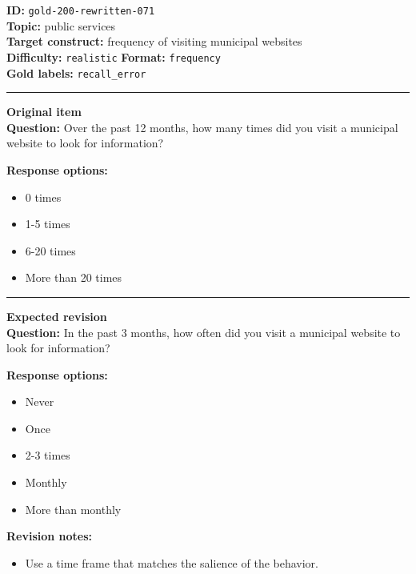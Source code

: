\documentclass[10pt,a4paper]{article}
\newcommand{\sectionline}{\vspace{0.15em}\hrule\vspace{0.35em}}
\begin{document}
\begin{tcolorbox}[colframe=FlawRed,colback=white,colbacktitle=FlawRed!9,coltitle=black,title={Item 071\hfill Flawed item}]
\textbf{ID:} \texttt{gold-200-rewritten-071}\\
\textbf{Topic:} public services\\
\textbf{Target construct:} frequency of visiting municipal websites\\
\textbf{Difficulty:} \texttt{realistic} \quad \textbf{Format:} \texttt{frequency}\\
\textbf{Gold labels:} \texttt{recall\_error}\\
\sectionline
\textbf{Original item}\\
\textbf{Question:} Over the past 12 months, how many times did you visit a municipal website to look for information?
\par\textbf{Response options:}
\begin{itemize}
\item 0 times
\item 1-5 times
\item 6-20 times
\item More than 20 times
\end{itemize}
\sectionline
\textbf{Expected revision}\\
\textbf{Question:} In the past 3 months, how often did you visit a municipal website to look for information?
\par\textbf{Response options:}
\begin{itemize}
\item Never
\item Once
\item 2-3 times
\item Monthly
\item More than monthly
\end{itemize}
\par\textbf{Revision notes:}
\begin{itemize}
\item Use a time frame that matches the salience of the behavior.
\end{itemize}
\end{tcolorbox}
\end{document}
